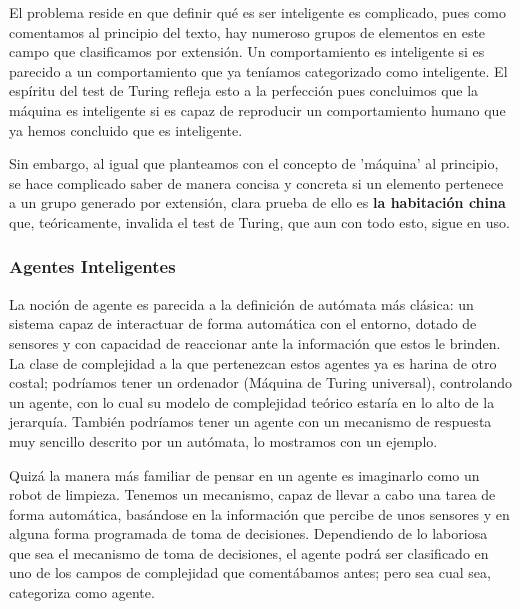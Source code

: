 \vspace{10px}

El problema reside en que definir qué es ser inteligente es complicado, pues como comentamos al principio del texto, hay numeroso grupos de elementos en este campo que clasificamos por extensión. Un comportamiento es inteligente si es parecido a un comportamiento que ya teníamos categorizado como inteligente. El espíritu del test de Turing refleja esto a la perfección pues concluimos que la máquina es inteligente si es capaz de reproducir un comportamiento humano que ya hemos concluido que es inteligente. 

\vspace{10px}

Sin embargo, al igual que planteamos con el concepto de 'máquina' al principio, se hace complicado saber de manera concisa y concreta si un elemento pertenece a un grupo generado por extensión, clara prueba de ello es \textbf{la habitación china} que, teóricamente, invalida el test de Turing, que aun con todo esto, sigue en uso.

\subsubsection{Agentes Inteligentes}


La noción de agente es parecida a la definición de autómata más clásica: un sistema capaz de interactuar de forma automática con el entorno, dotado de sensores y con capacidad de reaccionar ante la información que estos le brinden. La clase de complejidad a la que pertenezcan estos agentes ya es harina de otro costal; podríamos tener un ordenador (Máquina de Turing universal), controlando un agente, con lo cual su modelo de complejidad teórico estaría en lo alto de la jerarquía. También podríamos tener un agente con un mecanismo de respuesta muy sencillo descrito por un autómata, lo mostramos con un ejemplo.


\vspace{10px}

Quizá la manera más familiar de pensar en un agente es imaginarlo como un robot de limpieza. Tenemos un mecanismo, capaz de llevar a cabo una tarea de forma automática, basándose en la información que percibe de unos sensores y en alguna forma programada de toma de decisiones. Dependiendo de lo laboriosa que sea el mecanismo de toma de decisiones, el agente podrá ser clasificado en uno de los campos de complejidad que comentábamos antes; pero sea cual sea, categoriza como agente.

